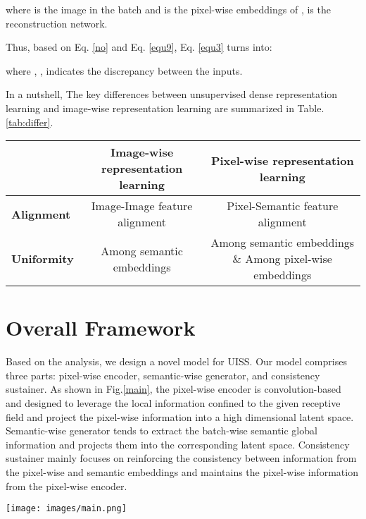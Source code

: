 \documentclass[letterpaper]{article} \usepackage{aaai23}  \usepackage{times}  \usepackage{helvet}  \usepackage{courier}  \usepackage[hyphens]{url}  \usepackage{graphicx} \urlstyle{rm} \def\UrlFont{\rm}  \usepackage{natbib}  \usepackage{caption} \frenchspacing  \setlength{\pdfpagewidth}{8.5in}  \setlength{\pdfpageheight}{11in}  \usepackage{algorithm}
\begin{document}
where  is the  image in the batch and  is the pixel-wise embeddings of ,  is the reconstruction network. 

Thus, based on Eq. \ref{no} and Eq. \ref{equ9},  Eq. \ref{equ3} turns into:

where , ,  indicates the discrepancy between the inputs.

In a nutshell, The key differences between unsupervised dense representation learning and image-wise representation learning are summarized in Table. \ref{tab:differ}.


\begin{table*}[]
    \centering
    \begin{tabular}{l|c|c}
    \hline
 & \textbf{Image-wise representation learning}  & \textbf{Pixel-wise representation learning}\\
    \hline
    \textbf{Alignment}  & {Image-Image feature alignment}& {Pixel-Semantic feature alignment }  \\
    \hline
    \textbf{Uniformity}   & {Among semantic embeddings}  &  {Among semantic embeddings \& Among pixel-wise embeddings} \\
    \hline
    \end{tabular}
    \caption{Discrepancies between image-wise and pixel-wise representation learning(from contrastive learning view).}
    \label{tab:differ}
\end{table*}






\section{Overall Framework}
Based on the analysis, we design a novel model for UISS.
Our model comprises three parts: pixel-wise encoder, semantic-wise generator, and consistency sustainer. As shown in Fig.\ref{main}, the pixel-wise encoder is convolution-based and designed to leverage the local information confined to the given receptive field and project the pixel-wise information into a high dimensional latent space. Semantic-wise generator tends to extract the batch-wise semantic global information and projects them into the corresponding latent space. Consistency sustainer mainly focuses on reinforcing the consistency between information from the pixel-wise and semantic embeddings and maintains the pixel-wise information from the pixel-wise encoder. 

\begin{figure*}[t]
\centering
\texttt{[image: images/main.png]} \caption{{ The architecture of SAN Network.} The pixel-wise encoder maps the image into a high dimensional latent space and produces pixel-wise embeddings to be clustered. The semantic-wise Generator generates semantic embeddings, serving as centers to align and group the pixel-wise features. After processing by the SEAT module, the consistency sustainer maintains the consistency between the pixel-wise features (from the pixel-wise encoder) and generated pixel-wise features (reconstructed from SEAT) to provide a constraint for the model learning. The  and  are the  loss function.}
\label{main}
\end{figure*}
\end{document}
